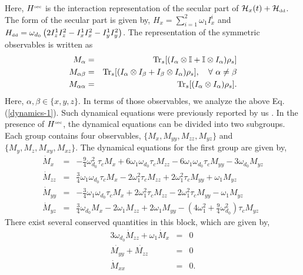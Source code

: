 \documentclass[pra,aps,preprint,floatfix]{revtex4-1}
\newcommand{\hdd}{\mathcal{H}_{\scriptscriptstyle \rm dd}}
\newcommand{\nn}{\nonumber}
\begin{document}
Here, $H^{\scriptscriptstyle \rm sec}$ is the interaction representation of the secular part of 
$\mathcal{H}_x(t) + \hdd$. The form of the secular part is given by, $H_x = \sum\limits_{i=1}^2 \omega_1 I_{x}^i$ 
and $H_{\scriptscriptstyle \rm dd} = \omega_{d_0} \left(2 I_z^1 I_z^2 - I_x^1 I_x^2 - I_y^1 I_y^2 \right) $. The 
representation of the symmetric observables is written as
\begin{eqnarray}
M_{\alpha} &=&   {\rm Tr}_s  [ (I_{\alpha}\otimes \mathbb{I} + \mathbb{I} \otimes I_{\alpha})\rho_s ] \nn\\
M_{\alpha\beta}&=&   {\rm Tr}_s [(I_{\alpha} \otimes I_{\beta} + I_{\beta} \otimes I_{\alpha})
\rho_s ],\quad \forall\ \alpha\neq\beta \nn \\
M_{\alpha\alpha} &=&  {\rm Tr}_s [(I_{\alpha}\otimes I_{\alpha})\rho_s]. 
\label{observables}
\end{eqnarray} 
Here, $\alpha, \beta \in \{x,y,z\}$. In terms of those observables, we analyze the above Eq. (\ref{dynamics-1}). Such 
dynamical equations were previously reported by us \cite{saha_cascaded_2023}. In the presence of 
$H^{\scriptscriptstyle \rm sec}$, the dynamical equations can be divided into two subgroups. Each group
contains four observables, $\{M_x, M_{yy}, M_{zz}, M_{yz}\}$ and $\{M_y, M_{z}, M_{xy}, M_{xz}\}$. The
dynamical equations for the first group are given by,
\begin{eqnarray}\label{eq-pre} 
\dot{M}_{x} &=& -\frac{9}{4} \omega_{d_0}^2 \tau_c  M_{x} + 6 \omega_1 \omega_{d_0} \tau_c M_{zz} -6 \omega_1 \omega_{d_0} \tau_c M_{yy} -3\omega_{d_0} M_{yz} \\
\dot{M}_{zz} &=&  \frac{3}{4}\omega_1 \omega_{d_0} \tau_c M_{x} -2\omega_1^2 \tau_c M_{zz} +  2\omega_1^2 \tau_c M_{yy} + \omega_1 M_{yz}  \\
\dot{M}_{yy} &=&  -\frac{3}{4}\omega_1 \omega_{d_0} \tau_c M_{x} +2\omega_1^2 \tau_c M_{zz} -  2\omega_1^2 \tau_c M_{yy} - \omega_1 M_{yz}  \\
\dot{M}_{yz} &=& \frac{3}{4}\omega_{d_0} M_{x} -2 \omega_1 M_{zz} +2\omega_1 M_{yy} -(4 \omega_1^2 + \frac{9}{4}\omega_{d_0}^2 ) \tau_c M_{yz}
\end{eqnarray}
There exist several conserved quantities in this block, which are given by,
\begin{eqnarray}
3\omega_{d_0}\dot{M}_{zz}+\omega_1  \dot{M}_{x} &=& 0\\
\dot{M_{yy}}+\dot{M_{zz}} &=& 0\\
\dot{M}_{xx} &=& 0.
\end{eqnarray}
\end{document}

